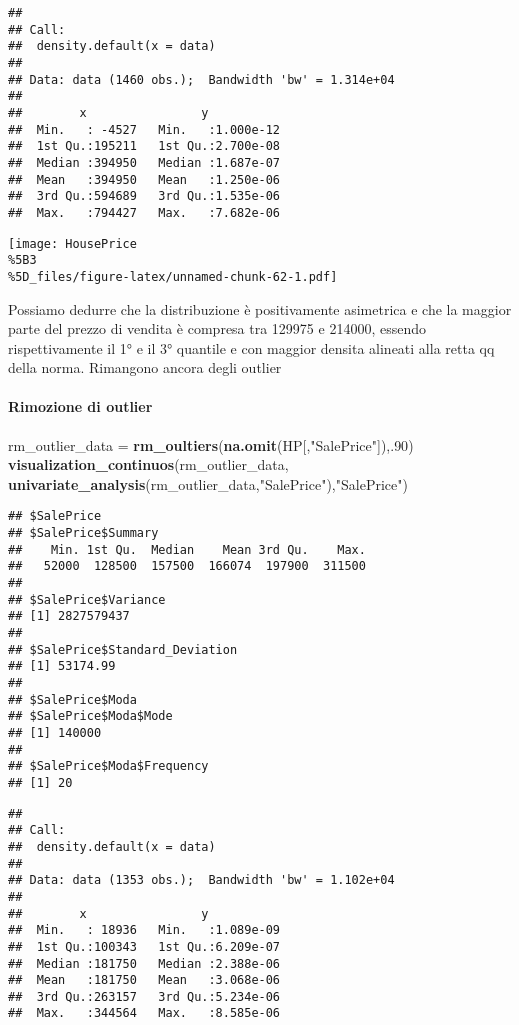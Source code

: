 \documentclass[
]{article}
\newenvironment{Shaded}{\begin{snugshade}}{\end{snugshade}}
\newcommand{\DecValTok}[1]{\textcolor[rgb]{0.00,0.00,0.81}{#1}}
\newcommand{\FunctionTok}[1]{\textcolor[rgb]{0.13,0.29,0.53}{\textbf{#1}}}
\newcommand{\NormalTok}[1]{#1}
\newcommand{\OtherTok}[1]{\textcolor[rgb]{0.56,0.35,0.01}{#1}}
\newcommand{\StringTok}[1]{\textcolor[rgb]{0.31,0.60,0.02}{#1}}
\begin{document}
\begin{verbatim}
## 
## Call:
##  density.default(x = data)
## 
## Data: data (1460 obs.);  Bandwidth 'bw' = 1.314e+04
## 
##        x                y            
##  Min.   : -4527   Min.   :1.000e-12  
##  1st Qu.:195211   1st Qu.:2.700e-08  
##  Median :394950   Median :1.687e-07  
##  Mean   :394950   Mean   :1.250e-06  
##  3rd Qu.:594689   3rd Qu.:1.535e-06  
##  Max.   :794427   Max.   :7.682e-06
\end{verbatim}

\texttt{[image: HousePrice\\\%5B3\\\%5D\_files/figure-latex/unnamed-chunk-62-1.pdf]}

Possiamo dedurre che la distribuzione è positivamente asimetrica e che
la maggior parte del prezzo di vendita è compresa tra 129975 e 214000,
essendo rispettivamente il 1° e il 3° quantile e con maggior densita
alineati alla retta qq della norma. Rimangono ancora degli outlier

\paragraph{Rimozione di outlier}\label{rimozione-di-outlier-14}

\begin{Shaded}
\begin{Highlighting}[]
\NormalTok{rm\_outlier\_data }\OtherTok{=} \FunctionTok{rm\_oultiers}\NormalTok{(}\FunctionTok{na.omit}\NormalTok{(HP[,}\StringTok{"SalePrice"}\NormalTok{]),.}\DecValTok{90}\NormalTok{)}
\FunctionTok{visualization\_continuos}\NormalTok{(rm\_outlier\_data, }\FunctionTok{univariate\_analysis}\NormalTok{(rm\_outlier\_data,}\StringTok{"SalePrice"}\NormalTok{),}\StringTok{"SalePrice"}\NormalTok{)}
\end{Highlighting}
\end{Shaded}

\begin{verbatim}
## $SalePrice
## $SalePrice$Summary
##    Min. 1st Qu.  Median    Mean 3rd Qu.    Max. 
##   52000  128500  157500  166074  197900  311500 
## 
## $SalePrice$Variance
## [1] 2827579437
## 
## $SalePrice$Standard_Deviation
## [1] 53174.99
## 
## $SalePrice$Moda
## $SalePrice$Moda$Mode
## [1] 140000
## 
## $SalePrice$Moda$Frequency
## [1] 20
\end{verbatim}

\begin{verbatim}
## 
## Call:
##  density.default(x = data)
## 
## Data: data (1353 obs.);  Bandwidth 'bw' = 1.102e+04
## 
##        x                y            
##  Min.   : 18936   Min.   :1.089e-09  
##  1st Qu.:100343   1st Qu.:6.209e-07  
##  Median :181750   Median :2.388e-06  
##  Mean   :181750   Mean   :3.068e-06  
##  3rd Qu.:263157   3rd Qu.:5.234e-06  
##  Max.   :344564   Max.   :8.585e-06
\end{verbatim}
\end{document}
